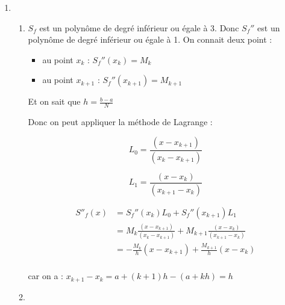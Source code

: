 \documentclass[12pt, letterpaper]{article}
\begin{document}
\begin{enumerate}

\item

  \begin{enumerate}

  \item

    $S_f$ est un polynôme de degré inférieur ou égale à 3.\newline
    Donc $S_f''$ est un polynôme de degré inférieur ou égale à
    1.\newline
    On connait deux point :

    \begin{itemize}
    \item au point $x_k$ : $S_f''(x_k) = M_k$
    \item au point $x_{k + 1}$ : $S_f''(x_{k + 1}) = M_{k + 1}$
    \end{itemize}

    Et on sait que $h = \frac{b - a}{N}$ \newline

    Donc on peut appliquer la méthode de Lagrange : \newline

    \begin{equation*}
      L_0 = \frac{(x - x_{k + 1})}{(x_k - x_{k + 1})}
    \end{equation*}

    \begin{equation*}
      L_1 = \frac{(x - x_k)}{(x_{k + 1} - x_k)}
    \end{equation*}

    \begin{equation*}
      \begin{split}
        S''_f(x) & = S_f''(x_k) L_0 + S_f''(x_{k + 1}) L_1 \\
        & = M_k \frac{(x - x_{k + 1})}{(x_k - x_{k + 1})} + M_{k + 1}
        \frac{(x - x_k)}{(x_{k + 1} - x_k)} \\
        & = - \frac{M_k}{h} (x - x_{k + 1}) + 
        \frac{M_{k + 1}}{h} (x - x_k)\\
      \end{split}
    \end{equation*}

    car on a : $x_{k + 1} - x_k = a + (k + 1) h - (a + kh) = h$

  \item


\end{enumerate}
\end{enumerate}
\end{document}

